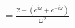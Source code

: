 \documentclass[preview]{standalone}
\begin{document}
\begin{align*}
&=\frac{2-(e^{i\omega}+e^{-i\omega})}{\omega^{2}} \quad \\
\end{align*}
\end{document}
